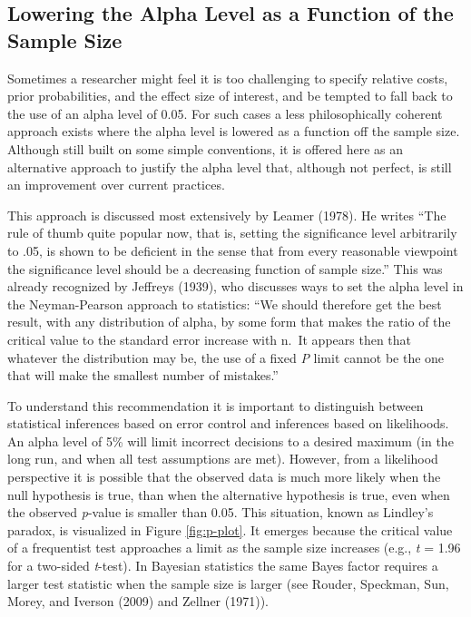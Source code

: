 \documentclass[
  english,
  ,jou,floatsintext]{apa6}
\begin{document}
\hypertarget{lowering-the-alpha-level-as-a-function-of-the-sample-size}{%
\subsection{Lowering the Alpha Level as a Function of the Sample Size}\label{lowering-the-alpha-level-as-a-function-of-the-sample-size}}

Sometimes a researcher might feel it is too challenging to specify relative costs, prior probabilities, and the effect size of interest, and be tempted to fall back to the use of an alpha level of 0.05. For such cases a less philosophically coherent approach exists where the alpha level is lowered as a function off the sample size. Although still built on some simple conventions, it is offered here as an alternative approach to justify the alpha level that, although not perfect, is still an improvement over current practices.

This approach is discussed most extensively by Leamer (1978). He writes ``The rule of thumb quite popular now, that is, setting the significance level arbitrarily to .05, is shown to be deficient in the sense that from every reasonable viewpoint the significance level should be a decreasing function of sample size.'' This was already recognized by Jeffreys (1939), who discusses ways to set the alpha level in the Neyman-Pearson approach to statistics: ``We should therefore get the best result, with any distribution of alpha, by some form that makes the ratio of the critical value to the standard error increase with n.~It appears then that whatever the distribution may be, the use of a fixed \emph{P} limit cannot be the one that will make the smallest number of mistakes.''

To understand this recommendation it is important to distinguish between statistical inferences based on error control and inferences based on likelihoods. An alpha level of 5\% will limit incorrect decisions to a desired maximum (in the long run, and when all test assumptions are met). However, from a likelihood perspective it is possible that the observed data is much more likely when the null hypothesis is true, than when the alternative hypothesis is true, even when the observed \emph{p}-value is smaller than 0.05. This situation, known as Lindley's paradox, is visualized in Figure \ref{fig:p-plot}. It emerges because the critical value of a frequentist test approaches a limit as the sample size increases (e.g., \emph{t} = 1.96 for a two-sided \emph{t}-test). In Bayesian statistics the same Bayes factor requires a larger test statistic when the sample size is larger (see Rouder, Speckman, Sun, Morey, and Iverson (2009) and Zellner (1971)).
\end{document}
